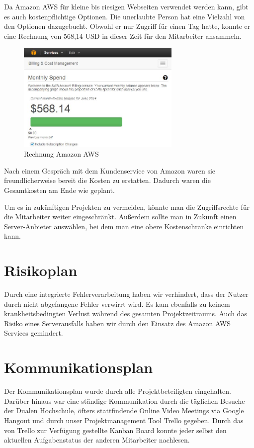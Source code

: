 \documentclass{article}
\begin{document}
Da Amazon AWS für kleine bis riesigen Webseiten verwendet werden kann, gibt es auch kostenpflichtige Optionen. Die unerlaubte Person hat eine Vielzahl von den Optionen dazugebucht. Obwohl er nur Zugriff für einen Tag hatte, konnte er eine Rechnung von 568,14 USD in dieser Zeit für den Mitarbeiter ansammeln.

\begin{figure}[H]
    \centering
    \includegraphics[width=0.7\textwidth]{images/amazon-bill.jpg}
    \caption{Rechnung Amazon AWS}
    \label{fig:bill}
\end{figure}

Nach einem Gespräch mit dem Kundenservice von Amazon waren sie freundlicherweise bereit die Kosten zu erstatten. Dadurch waren die Gesamtkosten am Ende wie geplant.

Um es in zukünftigen Projekten zu vermeiden, könnte man die Zugriffsrechte für die Mitarbeiter weiter eingeschränkt. Außerdem sollte man in Zukunft einen Server-Anbieter auswählen, bei dem man eine obere Kostenschranke einrichten kann.

\section{Risikoplan}

Durch eine integrierte Fehlerverarbeitung haben wir verhindert, dass der Nutzer durch nicht abgefangene Fehler verwirrt wird. Es kam ebenfalls zu keinem krankheitsbedingten Verlust während des gesamten Projektzeitraums. Auch das Risiko eines Serverausfalls haben wir durch den Einsatz des Amazon AWS Services gemindert.

\section{Kommunikationsplan}

Der Kommunikationsplan wurde durch alle Projektbeteiligten eingehalten. Darüber hinaus war eine ständige Kommunikation durch die täglichen Besuche der Dualen Hochschule, öfters stattfindende Online Video Meetings via Google Hangout und durch unser Projektmanagement Tool Trello gegeben. Durch das von Trello zur Verfügung gestellte Kanban Board konnte jeder selbst den aktuellen Aufgabenstatus der anderen Mitarbeiter nachlesen. 
\end{document}
